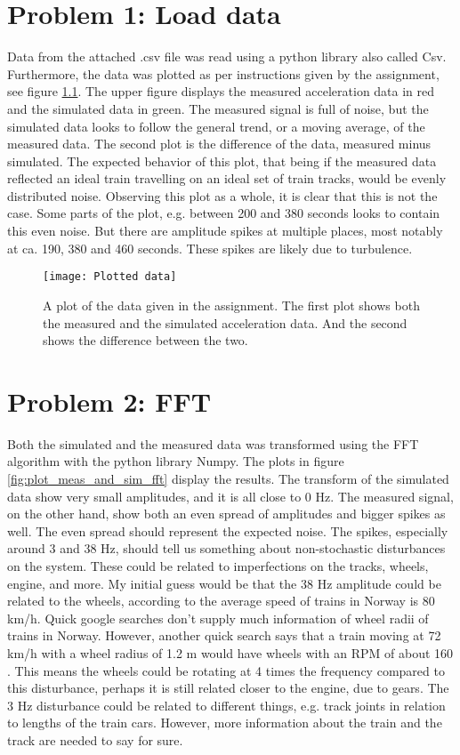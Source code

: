 \documentclass[%
oneside,    %
project,    %
nosummary   %
]{USN-MSc}
\begin{document}
\chapter{Problem 1: Load data}
\label{ch:intro}
Data from the attached .csv file was read using a python library also called Csv.
Furthermore, the data was plotted as per instructions given by the assignment, see figure \ref{fig:raw_data_plot}.
The upper figure displays the measured acceleration data in red and the simulated data in green.
The measured signal is full of noise, but the simulated data looks to follow the general trend, or a moving average, of the measured data.
The second plot is the difference of the data, measured minus simulated. The expected behavior of this plot, that being if the measured data reflected an ideal train travelling on an ideal set of train tracks, would be evenly distributed noise.
Observing this plot as a whole, it is clear that this is not the case. Some parts of the plot, e.g. between 200 and 380 seconds looks to contain this even noise. 
But there are amplitude spikes at multiple places, most notably at ca. 190, 380 and 460 seconds. These spikes are likely due to turbulence.
\begin{figure}[!ht]
  \centering
  \texttt{[image: Plotted data]}
  \caption{
  A plot of the data given in the assignment. 
  The first plot shows both the measured and the simulated acceleration data. 
  And the second shows the difference between the two.}
  \label{fig:raw_data_plot}
\end{figure}

\chapter{Problem 2: FFT}
\label{ch:fft}
Both the simulated and the measured data was transformed using the FFT algorithm with the python library Numpy. The plots in figure \ref{fig:plot_meas_and_sim_fft} display the results.
The transform of the simulated data show very small amplitudes, and it is all close to 0 Hz. The measured signal, on the other hand, show both an even spread of amplitudes and bigger spikes as well.
The even spread should represent the expected noise. The spikes, especially around 3 and 38 Hz, should tell us something about non-stochastic disturbances on the system. These could be related to imperfections on the tracks, wheels, engine, and more.
My initial guess would be that the 38 Hz amplitude could be related to the wheels, according to \cite{enwiki:1105760953} the average speed of trains in Norway is 80 km/h. Quick google searches don't supply much information of wheel radii of trains in Norway.
However, another quick search says that a train moving at 72 km/h with a wheel radius of 1.2 m would have wheels with an RPM of about 160 \cite{Trainspe44:online}.
This means the wheels could be rotating at 4 times the frequency compared to this disturbance, perhaps it is still related closer to the engine, due to gears.
The 3 Hz disturbance could be related to different things, e.g. track joints in relation to lengths of the train cars. However, more information about the train and the track are needed to say for sure.
\end{document}
